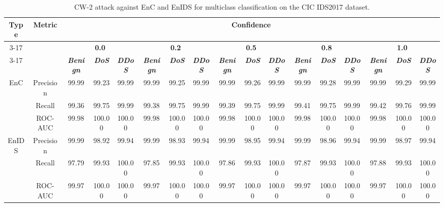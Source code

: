 \documentclass[conference]{IEEEtran}
\begin{document}
	
	\begin{table}[H]
		\caption{CW-2 attack against EnC and EnIDS for multiclass classification on the CIC IDS2017 dataset.}
		\small
		\setlength{\tabcolsep}{1pt}
		\centering
		\label{tab:cic_multi_cw}
		\hspace*{-1cm}
		\begin{tabular}{|c|c|c|c|c|c|c|c|c|c|c|c|c|c|c|c|c|}
			\hline
			\multirow{4}{*}{\textbf{Type}} & \multirow{4}{*}{\textbf{Metric}}& \multicolumn{15}{c|}{\textbf{Confidence}} \\
			\cline{3-17}
			&  & \multicolumn{3}{c|}{\textbf{0.0}} & \multicolumn{3}{c|}{\textbf{0.2}} & \multicolumn{3}{c|}{\textbf{0.5}} & \multicolumn{3}{c|}{\textbf{0.8}} & \multicolumn{3}{c|}{\textbf{1.0}} 
			\\
			\cline{3-17}
			&  & \textbf{\textsl{Benign}} & \textbf{\textsl{DoS}} & \textbf{\textsl{DDoS}} & \textbf{\textsl{Benign}} & \textbf{\textsl{DoS}} & \textbf{\textsl{DDoS}} & \textbf{\textsl{Benign}} & \textbf{\textsl{DoS}} & \textbf{\textsl{DDoS}} & \textbf{\textsl{Benign}} & \textbf{\textsl{DoS}} & \textbf{\textsl{DDoS}} & \textbf{\textsl{Benign}} & \textbf{\textsl{DoS}} & \textbf{\textsl{DDoS}}
			\\
			\hline
			\multirow{3}{*}{EnC} & Precision & 99.99 & 99.23 & 99.99 & 99.99 & 99.25 & 99.99 & 99.99 & 99.26 & 99.99 & 99.99 & 99.28 & 99.99 & 99.99 & 99.29 & 99.99
			\\
			
			& Recall & 99.36 & 99.75 & 99.99 & 99.38 & 99.75 & 99.99 & 99.39 & 99.75 & 99.99 & 99.41 & 99.75 & 99.99 & 99.42 & 99.76 & 99.99
			\\
			
			& ROC-AUC & 99.98 & 100.00 & 100.00 & 99.98 & 100.00 & 100.00 & 99.98 & 100.00 & 100.00 & 99.98 & 100.00 & 100.00 & 99.98 & 100.00 & 100.00
			\\
			\hline
			\multirow{3}{*}{EnIDS} & Precision & \cellcolor{blue!20}99.99 & 98.92 & 99.94 & \cellcolor{blue!20}99.99 & 98.93 & 99.94 & \cellcolor{blue!20}99.99 & 98.95 & 99.94 & \cellcolor{blue!20}99.99 & 98.96 & 99.94 & \cellcolor{blue!20}99.99 & 98.97 & 99.94
			\\
			
			& Recall & 97.79 & \cellcolor{yellow!50}99.93 & \cellcolor{yellow!50}100.00 & 97.85 & \cellcolor{yellow!50}99.93 & \cellcolor{yellow!50}100.00 & 97.86 & \cellcolor{yellow!50}99.93 & \cellcolor{yellow!50}100.00 & 97.87 & \cellcolor{yellow!50}99.93 & \cellcolor{yellow!50}100.00 & 97.88 & \cellcolor{yellow!50}99.93 & \cellcolor{yellow!50}100.00
			\\
			
			& ROC-AUC & 99.97 & \cellcolor{blue!20}100.00 & \cellcolor{blue!20}100.00 & 99.97 & \cellcolor{blue!20}100.00 & \cellcolor{blue!20}100.00 & 99.97 & \cellcolor{blue!20}100.00 & \cellcolor{blue!20}100.00 & 99.97 & \cellcolor{blue!20}100.00 & \cellcolor{blue!20}100.00 & 99.97 & \cellcolor{blue!20}100.00 & \cellcolor{blue!20}100.00
			\\
			\hline
		\end{tabular}
		
	\end{table}
	
\end{document}
